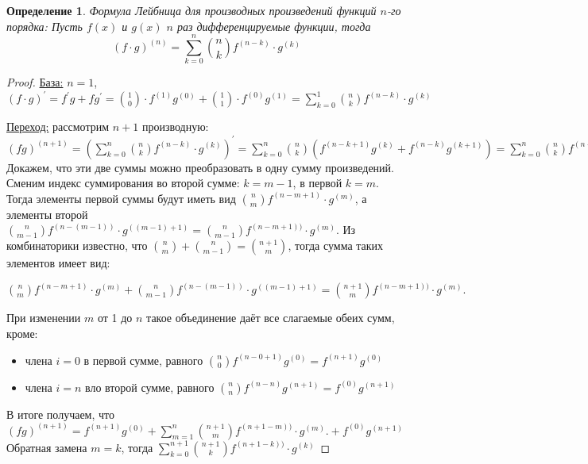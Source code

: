 \documentclass[a4paper,12pt]{article}
\newtheorem*{defi}{Определение}
\newcommand{\drv}{^{\prime}}
\begin{document}
    \begin{defi}
    Формула Лейбница для производных произведений функций $n$-го порядка:
        Пусть $f(x)$ и $g(x)$ \textemdash $n$ раз дифференцируемые функции,
        тогда
        $$
            (f\cdot g)^{(n)} = \sum\limits_{k=0}^{n} {n \choose k}
            f^{(n-k)}\cdot g^{(k)}
        $$
    \end{defi}
    \begin{proof}
        \underline{База:} $n=1$, $(f\cdot g)\drv = f\drv g + fg\drv = {1
        \choose 0}\cdot f^{(1)}g^{(0)} + {1 \choose 1}\cdot f^{(0)}g^{(1)} =
        \sum\limits_{k=0}^{1} {n \choose k} f^{(n-k)}\cdot g^{(k)}$

        \underline{Переход:} рассмотрим $n+1$ производную:
        $(fg)^{(n+1)} =
        ( \sum\limits_{k=0}^{n} {n \choose k} f^{(n-k)}\cdot g^{(k)})\drv =
        \sum\limits_{k=0}^{n} {n \choose
        k}(f^{(n-k+1)}g^{(k)}+f^{(n-k)}g^{(k+1)}) =
        \sum\limits_{k=0}^{n} {n \choose k} f^{(n-k+1)}\cdot g^{(k)}
        +
        \sum\limits_{k=0}^{n} {n \choose k} f^{(n-k)}\cdot g^{(k+1)}
        $
        Докажем, что эти две суммы можно преобразовать в одну сумму
        произведений. Сменим индекс суммирования во второй сумме: $k=m-1$, в
        первой $k=m$. Тогда элементы первой суммы будут иметь вид
        ${n \choose m} f^{(n-m+1)}\cdot g^{(m)}$, а элементы второй \textemdash
        ${n \choose m-1} f^{(n-(m-1))}\cdot g^{((m-1)+1)} =
        {n \choose m-1} f^{(n-m+1))}\cdot g^{(m)}.
        $
        Из комбинаторики известно, что ${n \choose m} + {n \choose m-1} = {n+1
        \choose m}$, тогда сумма таких элементов имеет вид:

        ${n \choose m} f^{(n-m+1)}\cdot g^{(m)} + {n \choose m-1}
        f^{(n-(m-1))}\cdot g^{((m-1)+1)} =
        {n+1 \choose m} f^{(n-m+1))}\cdot g^{(m)}.$

        При изменении $m$ от 1 до $n$ такое объединение даёт все слагаемые
        обеих сумм, кроме:
        \begin{itemize}
            \item члена $i = 0$ в первой сумме, равного ${n \choose
                0}f^{(n-0+1)}g^{(0)} = f^{(n+1)}g^{(0)}$
            \item члена $i = n$ вло второй сумме, равного ${n \choose
                n}f^{(n-n)}g^{(n+1)} = f^{(0)}g^{(n+1)}$
        \end{itemize}
        В итоге получаем, что $(fg)^{(n+1)} =
        f^{(n+1)}g^{(0)}
        +
        \sum\limits_{m=1}^{n}{n+1 \choose m}
        f^{(n+1-m))}\cdot g^{(m)}.
        +
        f^{(0)}g^{(n+1)}
        $
        Обратная замена $m=k$, тогда
        $
        \sum\limits_{k=0}^{n+1}{n+1 \choose k} f^{(n+1-k))}\cdot g^{(k)}
        $
    \end{proof}
\end{document}
